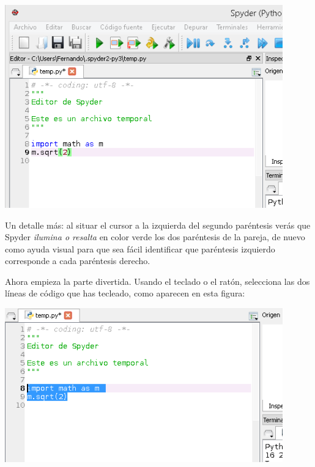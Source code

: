 \documentclass[10pt,a4paper]{article}\usepackage[]{graphicx}\usepackage[]{color}
\begin{document}
\begin{center}
\includegraphics[width=12cm]{../fig/Tut-02-py-24-EditorSpyder03.png}
\end{center}
Un detalle más: al situar el cursor a la izquierda del segundo paréntesis verás que Spyder {\em ilumina o resalta} en color verde los dos paréntesis de la pareja, de nuevo como ayuda visual para que sea fácil identificar que paréntesis izquierdo corresponde a cada paréntesis derecho.

Ahora empieza la parte divertida. Usando el teclado o el ratón, selecciona las dos líneas de código que has tecleado, como aparecen en esta figura:
\begin{center}
\includegraphics[width=12cm]{../fig/Tut-02-py-24-EditorSpyder04.png}
\end{center}
\end{document}
